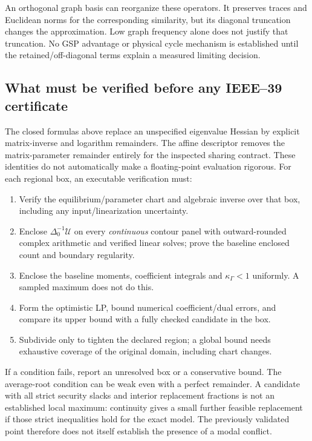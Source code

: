 An orthogonal graph basis can reorganize these operators.
It preserves traces and Euclidean norms for the corresponding
similarity, but its diagonal truncation changes the approximation.
Low graph frequency alone does not justify that truncation.
No GSP advantage or physical cycle mechanism is established until
the retained/off-diagonal terms explain a measured limiting decision.

\subsection{What must be verified before any IEEE--39 certificate}
The closed formulas above replace an unspecified eigenvalue Hessian
by explicit matrix-inverse and logarithm remainders. The affine
descriptor removes the matrix-parameter remainder entirely for
the inspected sharing contract. These identities do not
automatically make a floating-point evaluation rigorous.
For each regional box, an executable verification must:
\begin{enumerate}
 \item Verify the equilibrium/parameter chart and algebraic inverse
 over that box, including any input/linearization uncertainty.
 \item Enclose $\Delta_0^{-1}\mathcal U$ on every \emph{continuous}
 contour panel with outward-rounded complex arithmetic and verified
 linear solves; prove the baseline enclosed count and boundary regularity.
 \item Enclose the baseline moments, coefficient integrals and
 $\kappa_\Gamma<1$ uniformly. A sampled maximum does not do this.
 \item Form the optimistic LP, bound numerical coefficient/dual errors,
 and compare its upper bound with a fully checked candidate in the box.
 \item Subdivide only to tighten the declared region; a global bound
 needs exhaustive coverage of the original domain, including chart changes.
\end{enumerate}
If a condition fails, report an unresolved box or a conservative bound.
The average-root condition can be weak even with a perfect remainder.
A candidate with all strict security slacks and interior replacement
fractions is not an established local maximum: continuity gives a
small further feasible replacement if those strict inequalities hold
for the exact model. The previously validated point therefore does
not itself establish the presence of a modal conflict.

